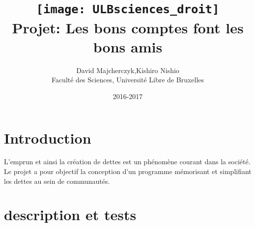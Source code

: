 \documentclass[a4paper]{article}
\begin{document}
\newcommand\tab[1][1cm]{\hspace*{#1}}
\newcommand\spc[1][0.1cm]{\hspace*{#1}}
\title{
        \texttt{[image: ULBsciences\_droit]}\\
        Projet: Les bons comptes font les bons amis \\
      }
\author{
David Majcherczyk,Kishiro Nishio\\
Facult\'e des Sciences, Universit\'e Libre de Bruxelles\\
}
\date{2016-2017}
\maketitle
\thispagestyle{empty}
\newpage
\setcounter{page}{1}
\section{Introduction}
L'emprun et ainsi la création de dettes est un phénomène courant dans la société. Le projet a pour objectif la conception d'un programme mémorisant et simplifiant les dettes au sein de communautés.

\section{description et tests}
\end{document}
